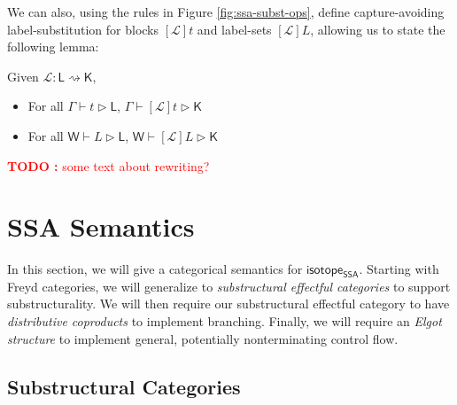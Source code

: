 \documentclass[acmsmall,screen,review]{acmart}
\newcounter{todos}
\newcommand{\TODO}[1]{{
  \stepcounter{todos}
  \begin{center}\large{\textcolor{red}{\textbf{TODO \arabic{todos}:} #1}}\end{center}
}}
\newcommand{\mc}[1]{\ensuremath{\mathcal{#1}}}
\newcommand{\ms}[1]{\ensuremath{\mathsf{#1}}}
\newcommand{\csplits}[3]{#1 \mapsto #2;#3}
\newcommand{\haslb}[3]{#1 \vdash #2 \rhd #3}
\newcommand{\lhaslb}[3]{#1 \vdash #2 \rhd #3}
\newcommand{\issubst}[3]{#1: #2 \mapsto #3}
\newcommand{\lbsubst}[3]{#1: #2 \rightsquigarrow #3}
\newcommand{\isotopessa}{\ms{isotope_{SSA}}}
\begin{document}


We can also, using the rules in Figure \ref{fig:ssa-subst-ops}, define
capture-avoiding label-substitution for blocks \([\mc{L}]t\) and label-sets
\([\mc{L}]L\), allowing us to state the following lemma:
\begin{lemma} 
  Given \(\lbsubst{\mc{L}}{\ms{L}}{\ms{K}}\), 
  \begin{itemize}
    \item For all \(\haslb{\Gamma}{t}{\ms{L}}\),
    \(\haslb{\Gamma}{[\mc{L}]t}{\ms{K}}\)
    \item For all \(\lhaslb{\ms{W}}{L}{\ms{L}}\),
    \(\lhaslb{\ms{W}}{[\mc{L}]L}{\ms{K}}\)
  \end{itemize}
\end{lemma}

\TODO{some text about rewriting?}

\section{SSA Semantics}

\label{sec:semantics}

In this section, we will give a categorical semantics for \isotopessa. Starting
with Freyd categories, we will generalize to \textit{substructural effectful
categories} to support substructurality. We will then require our substructural
effectful category to have \textit{distributive coproducts} to implement
branching. Finally, we will require an \textit{Elgot structure} to implement
general, potentially nonterminating control flow.

\subsection{Substructural Categories}
\end{document}
